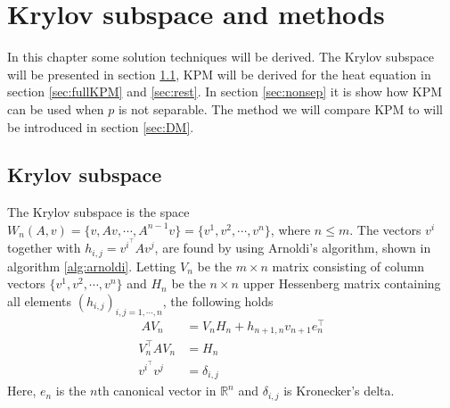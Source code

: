 \chapter{Krylov subspace and methods}%
\label{sec:krylov}
In this chapter some solution techniques will be derived.
The Krylov subspace will be presented in section \ref{sec:subspace}, KPM will be derived for the heat equation in section \ref{sec:fullKPM} and \ref{sec:rest}. In section \ref{sec:nonsep} it is show how KPM can be used when $p$ is not separable. The method we will compare KPM to will be introduced in section \ref{sec:DM}. 


\section{Krylov subspace} \label{sec:subspace}
The Krylov subspace is the space $W_n (A,v) = \{v,Av, \cdots, A^{n-1}v\} = \{v^1,v^2,\cdots,v^n\} $, where $n \leq m$. %
The vectors $v^i$ together with $h_{i,j} = v^i^\top Av^j$, are found by using Arnoldi's algorithm, shown in algorithm \ref{alg:arnoldi}. Letting $V_n$ be the $m \times n$ matrix consisting of column vectors $\{v^1,v^2,\cdots,v^n \}$ and $H_n$ be the $n \times n$ upper Hessenberg matrix containing all elements $(h_{i,j})_{i,j=1,\cdots,n}$, the following holds \cite{saad}
\begin{align}\
AV_n & = V_n H_n + h_{n+1,n}v_{n+1}e^\top_n \label{eqn:prop1} \\
V^{\top}_n AV_n &= H_n \label{eqn:prop2} \\
v^i^{\top} v^j &= \delta_{i,j} \label{eqn:prop3}
\end{align}
Here, $e_n$ is the $n$th canonical vector in $\mathbb{R}^n$ and $\delta_{i,j}$ is Kronecker's delta.\\




